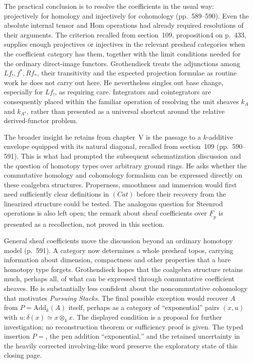 The practical conclusion is to resolve the coefficients in the usual way: projectively for homology and injectively for cohomology (pp.~589--590). Even the absolute internal tensor and Hom operations had already required resolutions of their arguments. The criterion recalled from section~109, proposition4 on p.~433, supplies enough projectives or injectives in the relevant presheaf categories when the coefficient category has them, together with the limit conditions needed for the ordinary direct-image functors. Grothendieck treats the adjunctions among $Lf_!,f^*,Rf_*$, their transitivity and the expected projection formulae as routine work he does not carry out here. He nevertheless singles out base change, especially for $Lf_!$, as requiring care. Integrators and cointegrators are consequently placed within the familiar operation of resolving the unit sheaves $k_A$ and $k_{A^o}$, rather than presented as a universal shortcut around the relative derived-functor problem.

The broader insight he retains from chapter~V is the passage to a $k$-additive envelope equipped with its natural diagonal, recalled from section~109 (pp.~590--591). This is what had prompted the subsequent schematization discussion and the question of homotopy types over arbitrary ground rings. He asks whether the commutative homology and cohomology formalism can be expressed directly on these coalgebra structures. Properness, smoothness and immersion would first need sufficiently clear definitions in $(Cat)$ before their recovery from the linearized structure could be tested. The analogous question for Steenrod operations is also left open; the remark about sheaf coefficients over $\underline F_p$ is presented as a recollection, not proved in this section.

General sheaf coefficients move the discussion beyond an ordinary homotopy model (p.~591). A category now determines a whole presheaf topos, carrying information about dimension, compactness and other properties that a bare homotopy type forgets. Grothendieck hopes that the coalgebra structure retains much, perhaps all, of what can be expressed through commutative coefficient sheaves. He is substantially less confident about the noncommutative cohomology that motivates \emph{Pursuing Stacks}. The final possible exception would recover $A$ from $P=\mathrm{Add}_k(A)$ itself, perhaps as a category of ``exponential'' pairs $(x,u)$ with $u:\delta(x)\simeq x\otimes_kx$. The displayed condition is a proposal for further investigation; no reconstruction theorem or sufficiency proof is given. The typed insertion $P=$, the pen addition ``exponential,'' and the retained uncertainty in the heavily corrected involving-like word preserve the exploratory state of this closing page.

